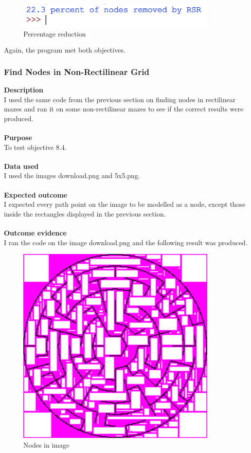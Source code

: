 \documentclass[titlepage]{article}
\begin{document}
\begin{figure}[H]
  \centering
  \includegraphics[width=10cm]{console2.png}
  \caption{Percentage reduction}
  \label{fig:dijk}
\end{figure}

Again, the program met both objectives.

\subsubsection{Find Nodes in Non-Rectilinear Grid}
\textbf{Description}\\
I used the same code from the previous section on finding nodes in rectilinear mazes and ran it on some non-rectilinear mazes to see if the correct results were produced.\\\\
\textbf{Purpose}\\
To test objective 8.4.\\\\
\textbf{Data used} \\
I used the images download.png and 5x5.png.\\\\
\textbf{Expected outcome}\\
I expected every path point on the image to be modelled as a node, except those inside the rectangles displayed in the previous section.\\\\
\textbf{Outcome evidence}\\
I ran the code on the image download.png and the following result was produced.

\begin{figure}[H]
  \centering
  \includegraphics[width=10cm]{Nodesbasicnonrect.png}
  \caption{Nodes in image}
  \label{fig:dijk}
\end{figure}
\end{document}

